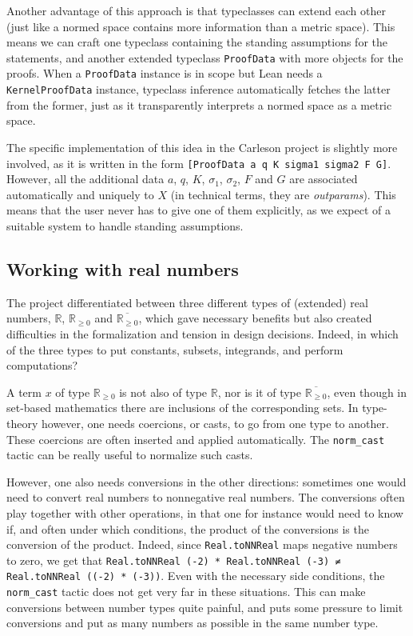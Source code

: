 \documentclass[12pt]{amsart}
\newcommand{\lean}[1]{\texttt{#1}}
\newcommand*{\real}{\mathbb{R}} %
\newcommand{\nnreal}{\real_{\ge0}}
\newcommand{\ennreal}{\overline{\real_{\ge0}}}
\begin{document}
Another advantage of this approach is that typeclasses can extend each other
(just like a normed space contains more information than a metric space).
This means we can craft one typeclass containing the standing assumptions for
the statements, and another extended typeclass \texttt{ProofData} with more
objects for the proofs. When a \texttt{ProofData} instance is in scope but
Lean needs a \texttt{KernelProofData} instance, typeclass inference
automatically fetches the latter from the former, just as it transparently
interprets a normed space as a metric space.

The specific implementation of this idea in the Carleson project is slightly
more involved, as it is written in the form \texttt{[ProofData a q K sigma1
sigma2 F G]}. However, all the additional data $a$, $q$, $K$, $\sigma_1$,
$\sigma_2$, $F$ and $G$ are associated automatically and uniquely to $X$ (in
technical terms, they are \emph{outparams}). This means that the user never
has to give one of them explicitly, as we expect of a suitable system to
handle standing assumptions.








\subsection{Working with real numbers}\label{subsec:real}

The project differentiated between three different types of (extended) real numbers, $\real$, $\nnreal$ and $\ennreal$,
which gave necessary benefits but also created difficulties in the formalization
and tension in design decisions.
Indeed, in which of the three types to put constants,
subsets, integrands, and perform computations?

A term $x$ of type $\nnreal$ is not also of type $\real$, nor is it of type $\ennreal$, even though in set-based mathematics there are inclusions of the corresponding sets. In type-theory however, one needs coercions, or casts, to go from one type to another. These coercions are often inserted and applied automatically.
The \texttt{norm\_cast} tactic can be really useful to normalize such casts.

However, one also needs conversions in the other directions: sometimes one would need to convert real numbers to nonnegative real numbers. The conversions often play together with other operations, in that one for instance would need to know if, and often under which conditions, the product of the conversions is the conversion of the product. Indeed, since \texttt{Real.toNNReal} maps negative numbers to zero, we get that
\lean{Real.toNNReal (-2) * Real.toNNReal (-3) ≠ Real.toNNReal ((-2) * (-3))}.
Even with the necessary side conditions, the \texttt{norm\_cast} tactic does not get very far
in these situations.
This can make conversions between number types quite painful,
and puts some pressure to limit conversions and put as many numbers as possible in the same number type.
\end{document}
